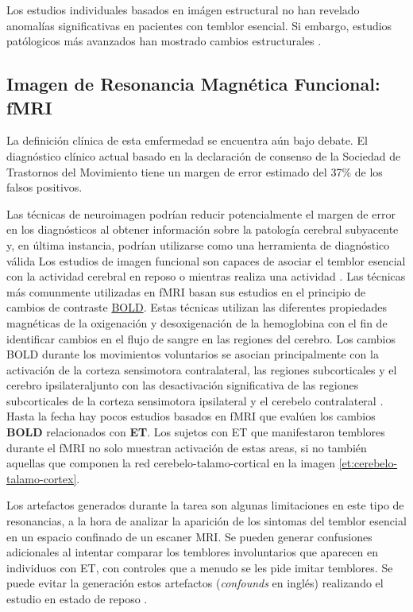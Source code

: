 Los estudios individuales basados en imágen estructural no han revelado anomalías significativas en pacientes con temblor esencial. Si embargo, estudios patólogicos más avanzados han mostrado cambios estructurales \cite{neuessentialsinet, anderson}.

\subsection{Imagen de Resonancia Magnética Funcional: fMRI}

La definición clínica de esta emfermedad se encuentra aún bajo debate. El diagnóstico clínico actual basado en la declaración de consenso de la Sociedad de Trastornos del Movimiento tiene un margen de error estimado del 37\% de los falsos positivos.\cite{neuessentialsinet}

Las técnicas de neuroimagen podrían reducir potencialmente el margen de error en los diagnósticos al obtener información sobre la patología cerebral subyacente y, en última instancia, podrían utilizarse como una herramienta de diagnóstico válida
Los estudios de imagen funcional son capaces de asociar el temblor esencial con la actividad cerebral en reposo o mientras realiza una actividad \cite{neuessentialsinet}. Las técnicas más comunmente utilizadas en fMRI basan sus estudios en el principio de cambios de contraste \hyperref[glos:bold]{BOLD}. Estas técnicas utilizan las diferentes propiedades magnéticas de la oxigenación y desoxigenación de la hemoglobina con el fin de identificar cambios en el flujo de sangre en las regiones del cerebro. Los cambios BOLD durante los movimientos voluntarios se asocian principalmente con la activación de la corteza sensimotora contralateral, las regiones subcorticales y el cerebro ipsilateraljunto con las desactivación significativa de las regiones subcorticales de la corteza sensimotora ipsilateral y el cerebelo contralateral \cite{movedisorder}.
Hasta la fecha hay pocos estudios basados en fMRI que evalúen los cambios \textbf{BOLD} relacionados con \textbf{ET}. Los sujetos con ET que manifestaron temblores durante el fMRI no solo muestran activación de estas areas, si no también aquellas que componen la red cerebelo-talamo-cortical en la imagen \ref{et:cerebelo-talamo-cortex}. 

Los artefactos generados durante la tarea son algunas limitaciones en este tipo de resonancias, a la hora de analizar la aparición de los sintomas del temblor esencial en un espacio confinado de un escaner MRI. Se pueden generar confusiones adicionales al intentar comparar los temblores involuntarios que aparecen en individuos con ET, con controles que a menudo se les pide imitar temblores. Se puede evitar la generación  estos artefactos (\textit{confounds} en inglés) realizando el estudio en estado de reposo \cite{ethandbook,movedisorder}. 

